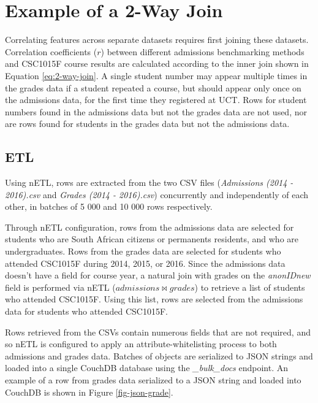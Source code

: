 \section{Example of a 2-Way Join}
Correlating features across separate datasets requires first joining these datasets. Correlation coefficients ($r$) between different admissions benchmarking methods and CSC1015F course results are calculated according to the inner join shown in Equation \ref{eq:2-way-join}. A single student number may appear multiple times in the grades data if a student repeated a course, but should appear only once on the admissions data, for the first time they registered at UCT. Rows for student numbers found in the admissions data but not the grades data are not used, nor are rows found for students in the grades data but not the admissions data.

\subsection{ETL}
Using nETL, rows are extracted from the two CSV files (\textit{Admissions (2014 - 2016).csv} and \textit{Grades (2014 - 2016).csv}) concurrently and independently of each other, in batches of 5 000 and 10 000 rows respectively.

Through nETL configuration, rows from the admissions data are selected for students who are South African citizens or permanents residents, and who are undergraduates. Rows from the grades data are selected for students who attended CSC1015F during 2014, 2015, or 2016. Since the admissions data doesn't have a field for course year, a natural join with grades on the \textit{anonIDnew} field is performed via nETL ($admissions \bowtie grades$) to retrieve a list of students who attended CSC1015F. Using this list, rows are selected from the admissions data for students who attended CSC1015F.

Rows retrieved from the CSVs contain numerous fields that are not required, and so nETL is configured to apply an attribute-whitelisting process to both admissions and grades data. Batches of objects are serialized to JSON strings and loaded into a single CouchDB database using the \textit{\_bulk\_docs} endpoint. An example of a row from grades data serialized to a JSON string and loaded into CouchDB is shown in Figure \ref{fig-json-grade}.




